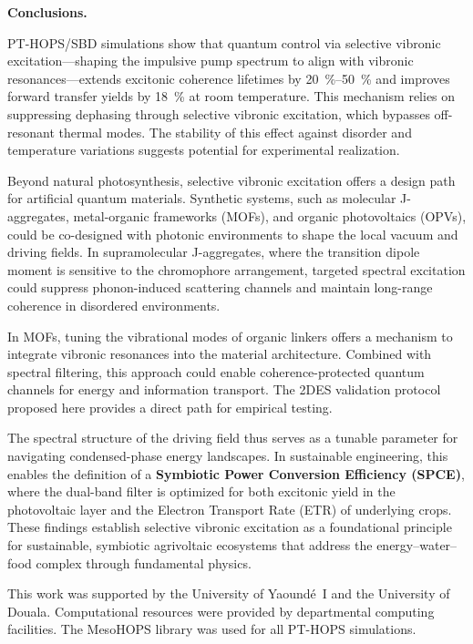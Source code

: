 \documentclass[journal=jpcl,manuscript=letter]{achemso}
\begin{document}
\textbf{Conclusions.}

PT-HOPS/SBD simulations show that quantum control via selective vibronic excitation---shaping the impulsive pump spectrum to align with vibronic resonances---extends excitonic coherence lifetimes by \SIrange{20}{50}{\percent} and improves forward transfer yields by \SI{18}{\percent} at room temperature. This mechanism relies on suppressing dephasing through selective vibronic excitation, which bypasses off-resonant thermal modes. The stability of this effect against disorder and temperature variations suggests potential for experimental realization.

Beyond natural photosynthesis, selective vibronic excitation offers a design path for artificial quantum materials. Synthetic systems, such as molecular J-aggregates, metal-organic frameworks (MOFs), and organic photovoltaics (OPVs), could be co-designed with photonic environments to shape the local vacuum and driving fields. In supramolecular J-aggregates, where the transition dipole moment is sensitive to the chromophore arrangement, targeted spectral excitation could suppress phonon-induced scattering channels and maintain long-range coherence in disordered environments.

In MOFs, tuning the vibrational modes of organic linkers offers a mechanism to integrate vibronic resonances into the material architecture. Combined with spectral filtering, this approach could enable coherence-protected quantum channels for energy and information transport. The 2DES validation protocol proposed here provides a direct path for empirical testing.

The spectral structure of the driving field thus serves as a tunable parameter for navigating condensed-phase energy landscapes. In sustainable engineering, this enables the definition of a \textbf{Symbiotic Power Conversion Efficiency (SPCE)}, where the dual-band filter is optimized for both excitonic yield in the photovoltaic layer and the Electron Transport Rate (ETR) of underlying crops. These findings establish selective vibronic excitation as a foundational principle for sustainable, symbiotic agrivoltaic ecosystems that address the energy--water--food complex through fundamental physics.


\begin{acknowledgement}
This work was supported by the University of Yaoundé~I and the University of Douala. Computational resources were provided by departmental computing facilities. The MesoHOPS library was used for all PT-HOPS simulations.
\end{acknowledgement}
\end{document}
